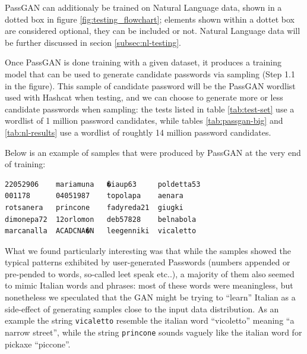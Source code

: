 PassGAN can additionaly be trained on Natural Language data, shown in a dotted box in figure \ref{fig:testing_flowchart}; elements shown within a dottet box are considered optional, they can be included or not. Natural Language data will be further discussed in secion \ref{subsec:nl-testing}.

Once PassGAN is done training with a given dataset, it produces a training model that can be used to generate candidate passwords via sampling (Step 1.1 in the figure). This sample of candidate password will be the PassGAN wordlist used with Hashcat when testing, and we can choose to generate more or less candidate passwords when sampling: the tests listed in table \ref{tab:test-set} use a wordlist of 1 million password candidates, while tables \ref{tab:passgan-big} and \ref{tab:nl-results} use a wordlist of roughtly 14 million password candidates.




Below is an example of samples that were produced by PassGAN at the very end of training: %
\begin{verbatim}
22052906    mariamuna   �iaup63     poldetta53
001178      04051987    topolapa    aenara
rotsanera   princone    fadyreda21  giugki
dimonepa72  12orlomon   deb57828    belnabola
marcanalla  ACADCNA�N   leegenniki  vicaletto
\end{verbatim}

What we found particularly interesting was that while the samples showed the typical patterns exhibited by user-generated Passwords (numbers appended or pre-pended to words, so-called leet speak etc..), a majority of them also seemed to mimic Italian words and phrases: most of these words were meaningless, but nonetheless we speculated that the GAN might be trying to \enquote{learn} Italian as a side-effect of generating samples close to the input data distribution.
As an example the string \texttt{vicaletto} resemble the italian word \enquote{vicoletto} meaning \enquote{a narrow street}, while the string \texttt{princone} sounds vaguely like the italian word for pickaxe \enquote{piccone}. 
